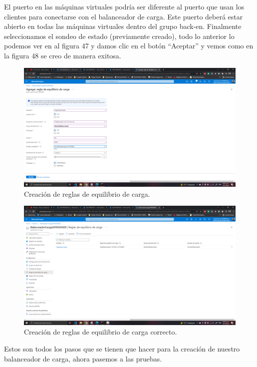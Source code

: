\documentclass[11pt]{article}
\begin{document}
El puerto en las máquinas virtuales podría ser diferente al puerto que usan los clientes para conectarse con el balanceador de carga. Este puerto deberá estar abierto en todas las máquinas virtuales dentro del grupo back-en.
Finalmente seleccionamos el sondeo de estado (previamente creado), todo lo anterior lo podemos ver en al figura 47 y damos clic en el botón ``Aceptar'' y vemos como en la figura 48 se creo de manera exitosa.
			\begin{figure}[H]
				\centering
				\includegraphics[scale=0.34]{resources/reglaBalanceador4-12.png}
				\caption{Creación de reglas de equilibrio de carga.}\label{fig:picture}
			\end{figure}
			\begin{figure}[H]
				\centering
				\includegraphics[scale=0.34]{resources/reglaBalanceadorF.png}
				\caption{Creación de reglas de equilibrio de carga correcto.}\label{fig:picture}
			\end{figure}
			Estos son todos los pasos que se tienen que hacer para la creación de nuestro balanceador de carga, ahora pasemos a las pruebas. 
			
\end{document}

